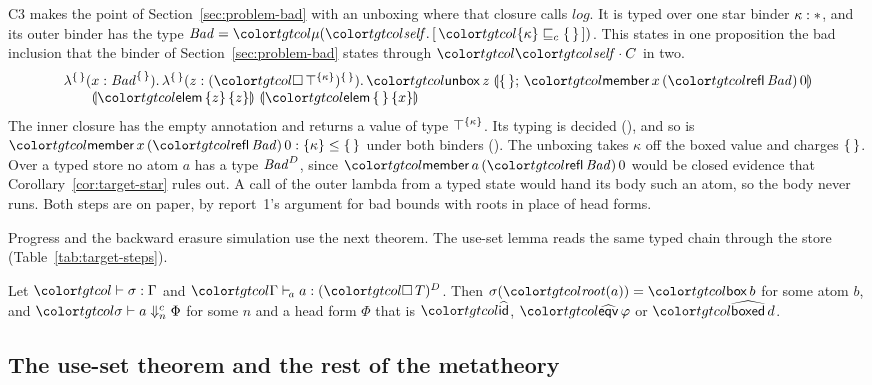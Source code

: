 \begin{example}\label{ex:target-bad}
C3 makes the point of Section~\ref{sec:problem-bad} with an unboxing where that closure calls $\mathit{log}$. It is typed over one star binder $\kappa : \ast$, and its outer binder has the type $\mathit{Bad} = \obj{[\,\plec{\cset{\kappa}}{\cempty}\,]}$. This states in one proposition the bad inclusion that the binder of Section~\ref{sec:problem-bad} states through $\sel{\self}{C}$ in two.
\[
\begin{array}{@{}l@{}}
\lambda^{\cempty}(x : \capt{\mathit{Bad}}{\cempty}).\,\lambda^{\cempty}(z : \capt{(\boxt{\capt{\top}{\cset{\kappa}}})}{\cempty}).\,\unboxc{z}{\cempty}{\ev{member}\,x\,(\ev{refl}\,\mathit{Bad})\,0} \\
\qquad \ann{\ev{elem}\,\cset{z}\,\cset{z}}\ \ann{\ev{elem}\,\cempty\,\cset{x}}
\end{array}
\]
The inner closure has the empty annotation and returns a value of type $\top^{\{\kappa\}}$. Its typing is decided (), and so is $\ev{member}\,x\,(\ev{refl}\,\mathit{Bad})\,0 : \cset{\kappa} \le \cempty$ under both binders (). The unboxing takes $\kappa$ off the boxed value and charges $\{\,\}$. Over a typed store no atom $a$ has a type $\mathit{Bad}^{D}$, since $\ev{member}\,a\,(\ev{refl}\,\mathit{Bad})\,0$ would be closed evidence that Corollary~\ref{cor:target-star} rules out. A call of the outer lambda from a typed state would hand its body such an atom, so the body never runs. Both steps are on paper, by report~1's argument for bad bounds with roots in place of head forms.
\end{example}

Progress and the backward erasure simulation use the next theorem. The use-set lemma reads the same typed chain through the store (Table~\ref{tab:target-steps}).

\begin{theorem}\label{thm:target-box}
Let $\storej{\sigma}{\Gamma}$ and $\atomj{\Gamma}{a}{\capt{(\boxt{T})}{D}}$. Then $\sigma(\rt{a}) = \ev{box}\,b$ for some atom $b$, and $\chn{\sigma}{a}{n}{\Phi}$ for some $n$ and a head form $\Phi$ that is $\form{id}$, $\form{eqv}\,\varphi$ or $\form{boxed}\,d$.
\end{theorem}

\subsection{The use-set theorem and the rest of the metatheory}\label{sec:target-meta}

